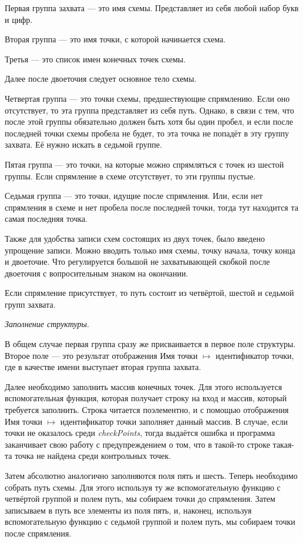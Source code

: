 \documentclass[12pt]{article}
\theoremstyle{plain}
\begin{document}
Первая группа захвата --- это имя схемы. Представляет из себя любой набор букв и цифр.

Вторая группа --- это имя точки, с которой начинается схема.

Третья --- это список имен конечных точек схемы.

Далее после двоеточия следует основное тело схемы. 

Четвертая группа — это точки схемы, предшествующие спрямлению. Если оно отсутствует, то эта группа представляет из себя путь. Однако, в связи с тем, что после этой группы обязательно должен быть хотя бы один пробел, и если после последней точки схемы пробела не будет, то эта точка не попадёт в эту группу захвата. Её нужно искать в седьмой группе.

Пятая группа --- это точки, на которые можно спрямляться с точек из шестой группы. Если спрямление в схеме отсутствует, то эти группы пустые. 

Седьмая группа --- это точки, идущие после спрямления. Или, если нет спрямления в схеме и нет пробела после последней точки, тогда тут находится та самая последняя точка.

Также для удобства записи схем состоящих из двух точек, было введено упрощение записи. Можно вводить только имя схемы, точку начала, точку конца и двоеточие. Что регулируется большой не захватывающей скобкой после двоеточия с вопросительным знаком на окончании.

Если спрямление присутствует, то путь состоит из четвёртой, шестой и седьмой групп захвата.

\medskip

\noindent
\textit{Заполнение структуры}. 

В общем случае первая группа сразу же присваивается в первое поле структуры. Второе поле --- это результат отображения Имя точки $\mapsto$ идентификатор точки, где в качестве имени выступает вторая группа захвата.

Далее необходимо заполнить массив конечных точек. Для этого используется вспомогательная функция, которая получает строку на вход и массив, который требуется заполнить. Строка читается поэлементно, и с помощью отображения Имя точки $\mapsto$ идентификатор точки заполняет данный массив. В случае, если точки не оказалось среди \textit{checkPoints}, тогда выдаётся ошибка и программа заканчивает свою работу с предупреждением о том, что в такой-то строке такая-та точка не найдена среди контрольных точек.

Затем абсолютно аналогично заполняются поля пять и шесть. Теперь необходимо собрать путь схемы. Для этого используя ту же вспомогательную функцию с четвёртой группой и полем путь, мы собираем точки до спрямления. Затем записываем в путь все элементы из поля пять, и, наконец, используя вспомогательную функцию с седьмой группой и полем путь, мы собираем точки после спрямления.
\end{document}
